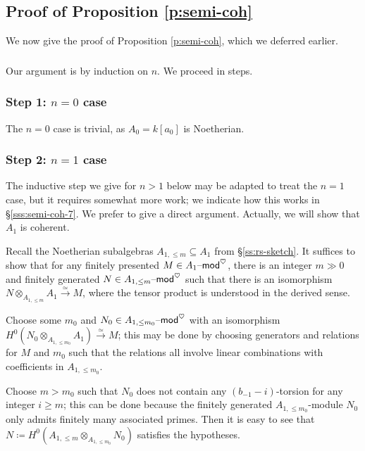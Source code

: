 \documentclass[reqno,11pt]{amsart}
\numberwithin{equation}{subsection}
\theoremstyle{remark}
\newcounter{steps}[thm]
\newcommand{\xar}[1]{\xrightarrow{#1}}
\newcommand{\rar}[1]{\xar{#1}}
\newcommand{\isom}{\rar{\simeq}}
\newcommand{\mathendash}{\text{\textendash}}
\renewcommand{\mod}{\mathendash\mathsf{mod}}
\newcommand{\heart}{\heartsuit}
\renewcommand{\subset}{\subseteq}
\begin{document}
\subsection{Proof of Proposition \ref{p:semi-coh}}\label{ss:z-semi-coh-pf}

We now give the proof of Proposition \ref{p:semi-coh}, which we deferred earlier.

\subsubsection{}

Our argument is by induction on $n$. We proceed in steps.

\subsubsection{Step 1: $n = 0$ case}

The $n = 0$ case is trivial, as $A_0 = k[a_0]$ is Noetherian.

\subsubsection{Step 2: $n = 1$ case} 

The inductive step we give for $n>1$ below may be adapted to treat the 
$n = 1$ case, but it requires somewhat more work; we indicate how this works
in \S \ref{sss:semi-coh-7}. We prefer
to give a direct argument. Actually, we will show that $A_1$ is coherent.

Recall the Noetherian subalgebras $A_{1,\leq m} \subset A_1$ from \S \ref{ss:rs-sketch}.
It suffices to show that for any finitely presented $M \in A_1\mod^{\heart}$,
there is an integer $m \gg 0$ and finitely generated
$N \in A_{1,\leq m}\mod^{\heart}$ such that
there is an isomorphism $N \otimes_{A_{1,\leq m}} A_1 \isom M$, where
the tensor product is understood in the derived sense.

Choose some $m_0$ and $N_0 \in A_{1,\leq m_0}\mod^{\heart}$ with an 
isomorphism $H^0(N_0 \otimes_{A_{1,\leq m_0}} A_1) \isom M$; this may be
done by choosing generators and relations for $M$ and $m_0$ such that 
the relations all involve linear combinations with coefficients in $A_{1,\leq m_0}$.

Choose $m > m_0$ such that $N_0$ does not contain any $(b_{-1}-i)$-torsion 
for any integer $i\geq m$; this can be done because the finitely generated
$A_{1,\leq m_0}$-module $N_0$ only admits finitely many associated primes.
Then it is easy to see that $N \coloneqq 
H^0(A_{1,\leq m} \otimes_{A_{1,\leq m_0}} N_0)$ satisfies the hypotheses.
\end{document}
